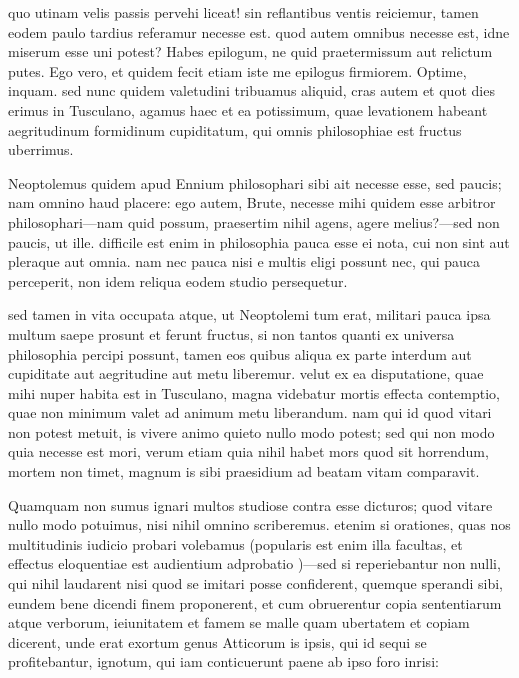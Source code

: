  quo utinam velis passis pervehi liceat! sin reflantibus ventis reiciemur, tamen eodem paulo tardius referamur necesse est. quod autem omnibus necesse est, idne miserum esse uni potest? Habes epilogum, ne quid praetermissum aut relictum putes. Ego vero, et quidem fecit etiam iste me epilogus firmiorem. Optime, inquam. sed nunc quidem valetudini tribuamus aliquid, cras autem et quot dies erimus in Tusculano, agamus haec et ea potissimum, quae levationem habeant aegritudinum formidinum cupiditatum, qui omnis philosophiae est fructus uberrimus.

 Neoptolemus quidem apud Ennium philosophari sibi ait necesse esse, sed paucis; nam omnino haud placere: ego autem, Brute, necesse mihi quidem esse arbitror philosophari—nam quid possum, praesertim nihil agens, agere melius?—sed non paucis, ut ille. difficile est enim in philosophia pauca esse ei nota, cui non sint aut pleraque aut omnia. nam nec pauca nisi e multis eligi possunt nec, qui pauca perceperit, non idem reliqua eodem studio persequetur.

 sed tamen in vita occupata atque, ut Neoptolemi tum erat, militari pauca ipsa multum saepe prosunt et ferunt fructus, si non tantos quanti ex universa philosophia percipi possunt, tamen eos quibus aliqua ex parte interdum aut cupiditate aut aegritudine aut metu liberemur. velut ex ea disputatione, quae mihi nuper habita est in Tusculano, magna videbatur mortis effecta contemptio, quae non minimum valet ad animum metu liberandum. nam qui id quod vitari non potest metuit, is vivere animo quieto nullo modo potest; sed qui non modo quia necesse est mori, verum etiam quia nihil habet mors quod sit horrendum, mortem non timet, magnum is sibi praesidium ad beatam vitam comparavit.

 Quamquam non sumus ignari multos studiose contra esse dicturos; quod vitare nullo modo potuimus, nisi nihil omnino scriberemus. etenim si orationes, quas nos multitudinis iudicio probari volebamus (popularis est enim illa facultas, et effectus eloquentiae est audientium adprobatio )—sed si reperiebantur non nulli, qui nihil laudarent nisi quod se imitari posse confiderent, quemque sperandi sibi, eundem bene dicendi finem proponerent, et cum obruerentur copia sententiarum atque verborum, ieiunitatem et famem se malle quam ubertatem et copiam dicerent, unde erat exortum genus Atticorum is ipsis, qui id sequi se profitebantur, ignotum, qui iam conticuerunt paene ab ipso foro inrisi:

